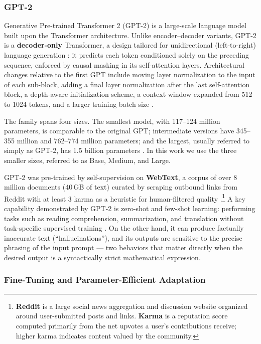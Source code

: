 \subsubsection{GPT-2}

Generative Pre-trained Transformer 2 (GPT-2) is a large-scale language model built upon the Transformer architecture. Unlike encoder--decoder variants, GPT-2 is a \textbf{decoder-only} Transformer, a design tailored for unidirectional (left-to-right) language generation \cite{radford2019language}: it predicts each token conditioned solely on the preceding sequence, enforced by causal masking in its self-attention layers. Architectural changes relative to the first GPT include moving layer normalization to the input of each sub-block, adding a final layer normalization after the last self-attention block, a depth-aware initialization scheme, a context window expanded from 512 to 1024 tokens, and a larger training batch size \cite{radford2019language}.

The family spans four sizes. The smallest model, with 117--124 million parameters, is comparable to the original GPT; intermediate versions have 345--355 million and 762--774 million parameters; and the largest, usually referred to simply as GPT-2, has 1.5 billion parameters \cite{jm3_llm_book, radford2019language}. In this work we use the three smaller sizes, referred to as Base, Medium, and Large.

GPT-2 was pre-trained by self-supervision on \textbf{WebText}, a corpus of over 8 million documents (40\,GB of text) curated by scraping outbound links from Reddit with at least 3 karma as a heuristic for human-filtered quality \cite{radford2019language}.\footnote{\textbf{Reddit} is a large social news aggregation and discussion website organized around user-submitted posts and links. \textbf{Karma} is a reputation score computed primarily from the net upvotes a user's contributions receive; higher karma indicates content valued by the community.} A key capability demonstrated by GPT-2 is zero-shot and few-shot learning: performing tasks such as reading comprehension, summarization, and translation without task-specific supervised training \cite{radford2019language}. On the other hand, it can produce factually inaccurate text (``hallucinations''), and its outputs are sensitive to the precise phrasing of the input prompt \cite{radford2019language} --- two behaviors that matter directly when the desired output is a syntactically strict mathematical expression.

\subsubsection{Fine-Tuning and Parameter-Efficient Adaptation}
\label{sec:bg_finetuning}

